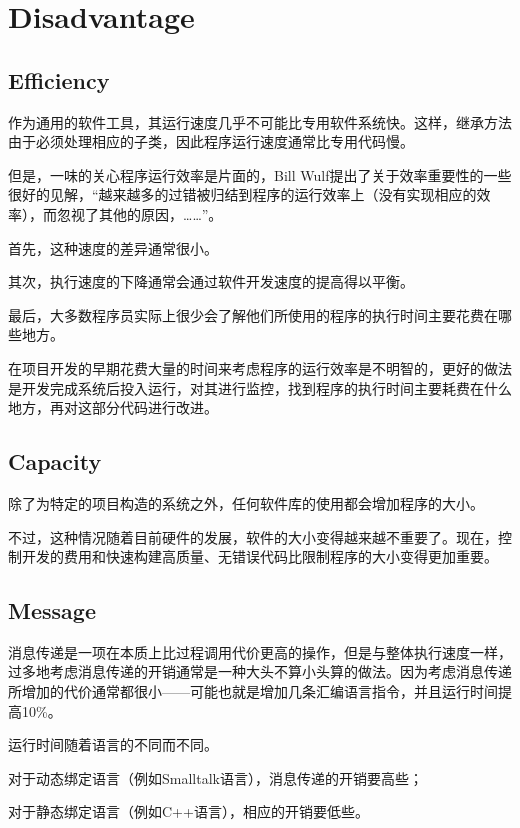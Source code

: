 \chapter{Disadvantage}

\section{Efficiency}

作为通用的软件工具，其运行速度几乎不可能比专用软件系统快。这样，继承方法由于必须处理相应的子类，因此程序运行速度通常比专用代码慢。

但是，一味的关心程序运行效率是片面的，Bill Wulf提出了关于效率重要性的一些很好的见解，“越来越多的过错被归结到程序的运行效率上（没有实现相应的效率），而忽视了其他的原因，……”。

\begin{compactitem}
\item 首先，这种速度的差异通常很小。
\item 其次，执行速度的下降通常会通过软件开发速度的提高得以平衡。
\item 最后，大多数程序员实际上很少会了解他们所使用的程序的执行时间主要花费在哪些地方。
\end{compactitem}

在项目开发的早期花费大量的时间来考虑程序的运行效率是不明智的，更好的做法是开发完成系统后投入运行，对其进行监控，找到程序的执行时间主要耗费在什么地方，再对这部分代码进行改进。

\section{Capacity}

除了为特定的项目构造的系统之外，任何软件库的使用都会增加程序的大小。

不过，这种情况随着目前硬件的发展，软件的大小变得越来越不重要了。现在，控制开发的费用和快速构建高质量、无错误代码比限制程序的大小变得更加重要。

\section{Message}

消息传递是一项在本质上比过程调用代价更高的操作，但是与整体执行速度一样，过多地考虑消息传递的开销通常是一种大头不算小头算的做法。因为考虑消息传递所增加的代价通常都很小——可能也就是增加几条汇编语言指令，并且运行时间提高10\%。

运行时间随着语言的不同而不同。

\begin{compactitem}
\item 对于动态绑定语言（例如Smalltalk语言），消息传递的开销要高些；
\item 对于静态绑定语言（例如C++语言），相应的开销要低些。
\end{compactitem}

